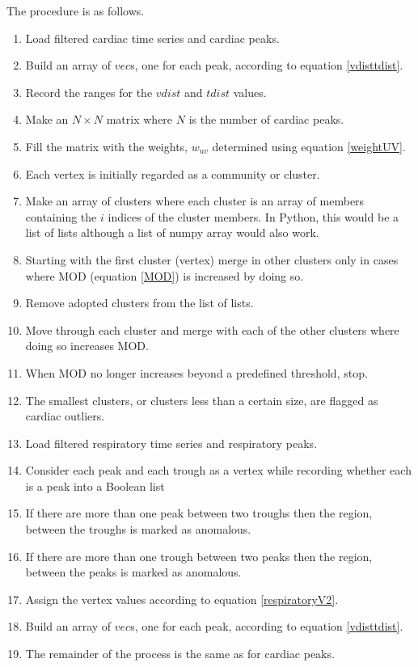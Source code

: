 \documentclass[twoside,twocolumn]{article}
\begin{document}
The procedure is as follows.
\begin{enumerate}
	\item Load filtered cardiac time series and cardiac peaks.
	\item Build an array of $vec$s, one for each peak, according to equation \ref{vdisttdist}.
	\item Record the ranges for the $vdist$ and $tdist$ values.
	\item Make an $N \times N$ matrix where $N$ is the number of cardiac peaks.
	\item Fill the matrix with the weights, $w_{uv}$ determined using equation \ref{weightUV}.
	\item Each vertex is initially regarded as a community or cluster.
	\item Make an array of clusters where each cluster is an array of members containing the $i$ indices of the cluster members.  In Python, this would be a list of lists although a list of numpy array would also work.
	\item Starting with the first cluster (vertex) merge in other clusters only in cases where MOD (equation \ref{MOD}) is increased by doing so.
	\item Remove adopted clusters from the list of lists.
	\item Move through each cluster and merge with each of the other clusters where doing so increases MOD.
	\item When MOD no longer increases beyond a predefined threshold, stop.
	\item The smallest clusters, or clusters less than a certain size, are flagged as cardiac outliers.
	\item Load filtered respiratory time series and respiratory peaks.
	\item Consider each peak and each trough as a vertex while recording whether each is a peak into a Boolean list
	\item If there are more than one peak between two troughs then the region, between the troughs is marked as anomalous.
	\item If there are more than one trough between two peaks then the region, between the peaks is marked as anomalous. 
	\item Assign the vertex values according to equation \ref{respiratoryV2}.
	\item Build an array of $vec$s, one for each peak, according to equation \ref{vdisttdist}.
	\item The remainder of the process is the same as for cardiac peaks.
\end{enumerate}
\end{document}
